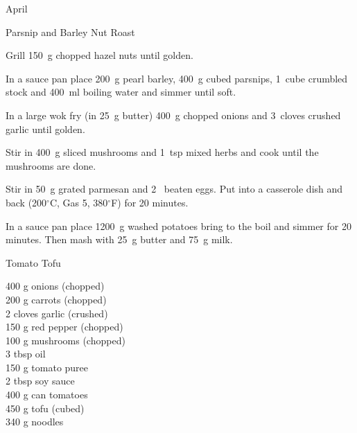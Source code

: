 \begin{menu}{April}
\begin{recipe}{2}{Parsnip and Barley Nut Roast}
\begin{ingredients}
		\end{ingredients}
	
	
    \begin{instructions}
    \item 
        Grill 150~g chopped hazel nuts until golden.
      \item 
        In a sauce pan
        place
        200~g  pearl barley,
        400~g cubed parsnips,
        1~cube crumbled stock
        and
        400~ml  boiling water
        and simmer until soft.
      \item 
        In a large wok fry
        (in 25~g  butter)
        400~g chopped onions
        and
        3~cloves crushed garlic
        until golden.
      \item 
        Stir in
        400~g sliced mushrooms
        and
        1~tsp  mixed herbs
        and cook until the mushrooms are done.
      \item 
        Stir in
        50~g grated parmesan
        and
        2~ beaten eggs.
        Put into a
        casserole dish
        and back
        (200$^{\circ}$C, Gas 5, 380$^{\circ}$F)
        for 20 minutes.
      \item 
    In a sauce pan place
    1200~g washed potatoes
    bring to the boil and simmer for 20 minutes.
    Then mash with
    25~g  butter
    and
    75~g  milk.
  
    \end{instructions}
    \end{recipe}%
  
    \begin{recipe}{2}{Tomato Tofu}%
		\begin{ingredients}
		400 g onions (chopped) \\
	200 g carrots (chopped) \\
	2 cloves garlic (crushed) \\
	150 g red pepper (chopped) \\
	100 g mushrooms (chopped) \\
	3 tbsp oil  \\
	150 g tomato puree  \\
	2 tbsp soy sauce  \\
	400 g can tomatoes  \\
	450 g tofu (cubed) \\
	340 g noodles  \\
	
		\end{ingredients}
	

\end{recipe}
\end{menu}
